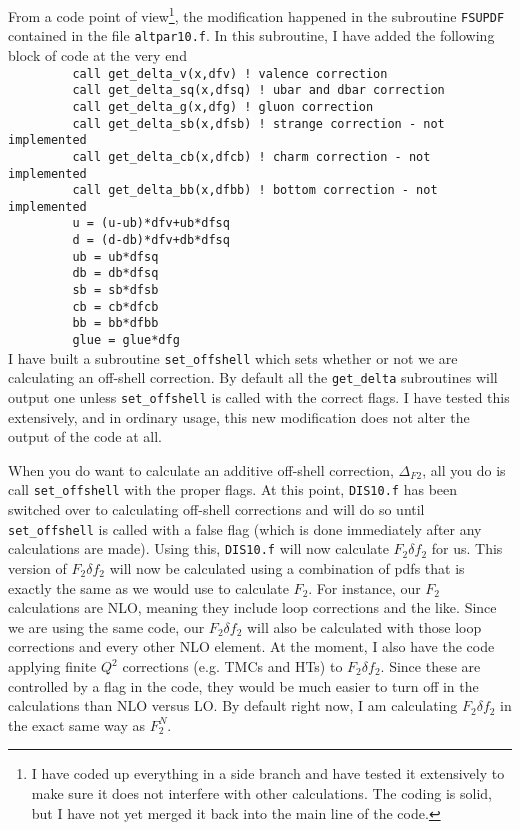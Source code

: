 \documentclass[12pt]{article}
\begin{document}
From a code point of view\footnote{I have coded up everything in a side branch and have tested it extensively to make sure it does not interfere with other calculations.  The coding is solid, but I have not yet merged it back into the main line of the code.}, the modification happened in the subroutine \verb+FSUPDF+ contained in the file \verb+altpar10.f+.  In this subroutine, I have added the following block of code at the very end\\
\verb~         call get_delta_v(x,dfv) ! valence correction~\\
\verb~         call get_delta_sq(x,dfsq) ! ubar and dbar correction~\\
\verb~         call get_delta_g(x,dfg) ! gluon correction~\\
\verb~         call get_delta_sb(x,dfsb) ! strange correction - not implemented~\\
\verb~         call get_delta_cb(x,dfcb) ! charm correction - not implemented~\\
\verb~         call get_delta_bb(x,dfbb) ! bottom correction - not implemented~\\
\verb~         u = (u-ub)*dfv+ub*dfsq~\\
\verb~         d = (d-db)*dfv+db*dfsq~\\
\verb~         ub = ub*dfsq~\\
\verb~         db = db*dfsq~\\
\verb~         sb = sb*dfsb~\\
\verb~         cb = cb*dfcb~\\
\verb~         bb = bb*dfbb~\\
\verb~         glue = glue*dfg~\\
I have built a subroutine \verb+set_offshell+ which sets whether or not we are calculating an off-shell correction.  By default all the \verb+get_delta+ subroutines will output one unless \verb+set_offshell+ is called with the correct flags.  I have tested this extensively, and in ordinary usage, this new modification does not alter the output of the code at all.

When you do want to calculate an additive off-shell correction, $\Delta_{F2}$, all you do is call \verb+set_offshell+ with the proper flags.  At this point, \verb+DIS10.f+ has been switched over to calculating off-shell corrections and will do so until \verb+set_offshell+ is called with a false flag (which is done immediately after any calculations are made).  Using this, \verb+DIS10.f+ will now calculate $F_2\delta f_2$ for us.  This version of $F_2\delta f_2$ will now be calculated using a combination of pdfs that is exactly the same as we would use to calculate $F_2$.  For instance, our $F_2$ calculations are NLO, meaning they include loop corrections and the like.  Since we are using the same code, our $F_2\delta f_2$ will also be calculated with those loop corrections and every other NLO element.  At the moment, I also have the code applying finite $Q^2$ corrections (e.g. TMCs and HTs) to $F_2\delta f_2$.  Since these are controlled by a flag in the code, they would be much easier to turn off in the calculations than NLO versus LO.  By default right now, I am calculating $F_2\delta f_2$ in the exact same way as $F_2^N$.
\end{document}
